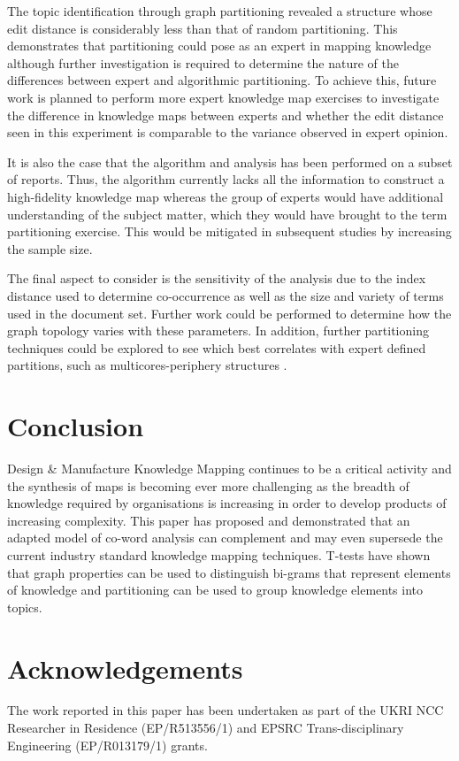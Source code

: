 \documentclass[a4paper, 11pt]{article}
\begin{document}
The topic identification through graph partitioning revealed a structure whose edit distance is considerably less than that of random partitioning. This demonstrates that partitioning could pose as an expert in mapping knowledge although further investigation is required to determine the nature of the differences between expert and algorithmic partitioning. To achieve this, future work is planned to perform more expert knowledge map exercises to investigate the difference in knowledge maps between experts and whether the edit distance seen in this experiment is comparable to the variance observed in expert opinion.

It is also the case that the algorithm and analysis has been performed on a subset of reports. Thus, the algorithm currently lacks all the information to construct a high-fidelity knowledge map whereas the group of experts would have additional understanding of the subject matter, which they would have brought to the term partitioning exercise. This would be mitigated in subsequent studies by increasing the sample size.

The final aspect to consider is the sensitivity of the analysis due to the index distance used to determine co-occurrence as well as the size and variety of terms used in the document set. Further work could be performed to determine how the graph topology varies with these parameters. In addition, further partitioning techniques could be explored to see which best correlates with expert defined partitions, such as multicores-periphery structures \parencite{yan_luo_2019}.


\section{Conclusion}\label{sec:con}

Design \& Manufacture Knowledge Mapping continues to be a critical activity and the synthesis of maps is becoming ever more challenging as the breadth of knowledge required by organisations is increasing in order to develop products of increasing complexity. This paper has proposed and demonstrated that an adapted model of co-word analysis can complement and may even supersede the current industry standard knowledge mapping techniques. T-tests have shown that graph properties can be used to distinguish bi-grams that represent elements of knowledge and partitioning can be used to group knowledge elements into topics.

\section*{Acknowledgements}

The work reported in this paper has been undertaken as part of the UKRI NCC Researcher in Residence (EP/R513556/1) and EPSRC Trans-disciplinary Engineering (EP/R013179/1) grants.

\printbibliography[]
\end{document}
